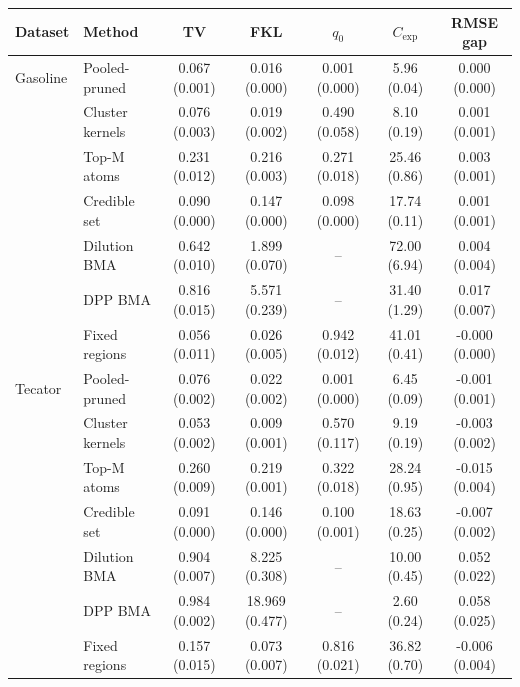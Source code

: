 \begin{tabular}{llccccc}
\toprule
Dataset & Method & TV & FKL & $q_0$ & $C_{\mathrm{exp}}$ & RMSE gap \\
\midrule
Gasoline & Pooled-pruned & 0.067 (0.001) & 0.016 (0.000) & 0.001 (0.000) & 5.96 (0.04) & 0.000 (0.000) \\
 & Cluster kernels & 0.076 (0.003) & 0.019 (0.002) & 0.490 (0.058) & 8.10 (0.19) & 0.001 (0.001) \\
 & Top-M atoms & 0.231 (0.012) & 0.216 (0.003) & 0.271 (0.018) & 25.46 (0.86) & 0.003 (0.001) \\
 & Credible set & 0.090 (0.000) & 0.147 (0.000) & 0.098 (0.000) & 17.74 (0.11) & 0.001 (0.001) \\
 & Dilution BMA & 0.642 (0.010) & 1.899 (0.070) & -- & 72.00 (6.94) & 0.004 (0.004) \\
 & DPP BMA & 0.816 (0.015) & 5.571 (0.239) & -- & 31.40 (1.29) & 0.017 (0.007) \\
 & Fixed regions & 0.056 (0.011) & 0.026 (0.005) & 0.942 (0.012) & 41.01 (0.41) & -0.000 (0.000) \\
\addlinespace
Tecator & Pooled-pruned & 0.076 (0.002) & 0.022 (0.002) & 0.001 (0.000) & 6.45 (0.09) & -0.001 (0.001) \\
 & Cluster kernels & 0.053 (0.002) & 0.009 (0.001) & 0.570 (0.117) & 9.19 (0.19) & -0.003 (0.002) \\
 & Top-M atoms & 0.260 (0.009) & 0.219 (0.001) & 0.322 (0.018) & 28.24 (0.95) & -0.015 (0.004) \\
 & Credible set & 0.091 (0.000) & 0.146 (0.000) & 0.100 (0.001) & 18.63 (0.25) & -0.007 (0.002) \\
 & Dilution BMA & 0.904 (0.007) & 8.225 (0.308) & -- & 10.00 (0.45) & 0.052 (0.022) \\
 & DPP BMA & 0.984 (0.002) & 18.969 (0.477) & -- & 2.60 (0.24) & 0.058 (0.025) \\
 & Fixed regions & 0.157 (0.015) & 0.073 (0.007) & 0.816 (0.021) & 36.82 (0.70) & -0.006 (0.004) \\
\bottomrule
\end{tabular}
